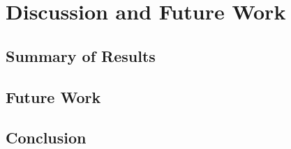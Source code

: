 %
%
%

\chapter{Discussion and Future Work}\label{ch:conclusion}

\section{Summary of Results}\label{ch:conclusion:summary}

\section{Future Work}\label{ch:conclusion:future}

\section{Conclusion}\label{ch:conclusion:end}

